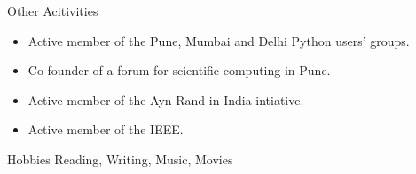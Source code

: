 \documentclass{resume} %
\begin{document}
\begin{rSection}{Other Acitivities}
    \begin{itemize}
        \item Active member of the Pune, Mumbai and Delhi Python users' groups.
        \item Co-founder of a forum for scientific computing in Pune.
        \item Active member of the Ayn Rand in India intiative.
        \item Active member of the IEEE.
    \end{itemize}
\end{rSection}

\begin{rSection}{Hobbies}
    Reading, Writing, Music, Movies
\end{rSection}
\end{document}
